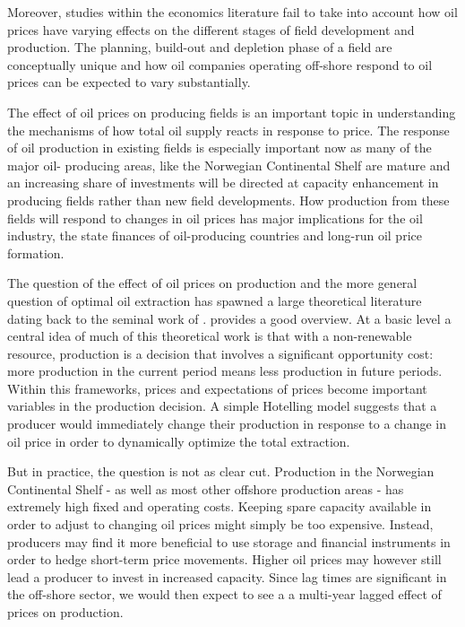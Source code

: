 \documentclass[12pt]{article}
\begin{document}
Moreover, studies within the economics literature fail to take into account how oil prices have varying effects on the different stages of field development and production.  The planning, build-out and depletion phase of a field are conceptually unique and how oil companies operating off-shore respond to oil prices can be expected to vary substantially.

The effect of oil prices on producing fields is an important topic in understanding the mechanisms of how total oil supply reacts in response to price. The response of oil production in existing fields is especially important now as many of the major oil- producing areas, like the Norwegian Continental Shelf are mature and an increasing share of investments will be directed at capacity enhancement in producing fields rather than new field developments. How production from these fields will respond to changes in oil prices has major implications for the oil industry, the state finances of oil-producing countries and long-run oil price formation.

The question of the effect of oil prices on production and the more general question of optimal oil extraction has spawned a large theoretical literature dating back to the seminal work of \citet{hotelling_economics_1931}. \citet{krautkraemer_nonrenewable_1998} provides a good overview. At a basic level a central idea of much of this theoretical work is that with a non-renewable resource, production is a decision that involves a significant opportunity cost: more production in the current period means less production in future periods.  Within this frameworks, prices and expectations of prices become important variables in the production decision. A simple Hotelling model suggests that a producer would immediately change their production in response to a change in oil price in order to dynamically optimize the total extraction.

But in practice, the question is not as clear cut.  Production in the Norwegian Continental Shelf - as well as most other offshore production areas - has extremely high fixed and operating costs.  Keeping spare capacity available in order to adjust to changing oil prices might simply be too expensive.  Instead, producers may find it more beneficial to use storage and financial instruments in order to hedge short-term price movements. Higher oil prices may however still lead a producer to invest in increased capacity.  Since lag times are significant in the off-shore sector, we would then expect to see a a multi-year lagged effect of prices on production.  
\end{document}
